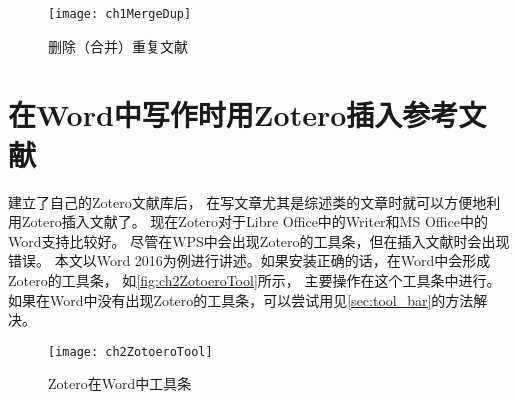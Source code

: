 \documentclass[cn,11pt,chinese]{elegantbook}
\begin{document}
					\begin{figure}[htbp]
						\centering
						\texttt{[image: ch1MergeDup]}
						\caption{删除（合并）重复文献}
						\label{fig:ch1MergeDup}
					\end{figure}

\chapter{在Word中写作时用Zotero插入参考文献}\label{ch:insert}
		建立了自己的Zotero文献库后，
		在写文章尤其是综述类的文章时就可以方便地利用Zotero插入文献了。
		现在Zotero对于Libre Office中的Writer和MS Office中的Word支持比较好。
		尽管在WPS中会出现Zotero的工具条，但在插入文献时会出现错误。
		本文以Word 2016为例进行讲述。如果安装正确的话，在Word中会形成Zotero的工具条，
		如\autoref{fig:ch2ZotoeroTool}所示，
		主要操作在这个工具条中进行。
		如果在Word中没有出现Zotero的工具条，可以尝试用见\cref{sec:tool_bar}的方法解决。
			\begin{figure}[htbp]
				\centering
				\texttt{[image: ch2ZotoeroTool]}
				\caption{Zotero在Word中工具条}
				\label{fig:ch2ZotoeroTool}
			\end{figure}
		
\end{document}
